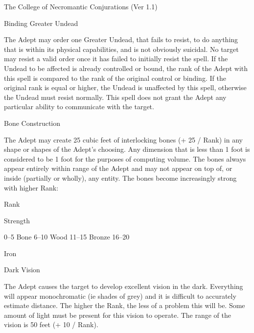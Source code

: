 \begin{Chapter}{The College of Necromantic Conjurations (Ver 1.1)}
\begin{spell}[S-3]{Binding Greater Undead}
\begin{effects}
The Adept may order one Greater Undead, that fails to resist, to do
anything that is within its physical capabilities, and is not
obviously suicidal.  No target may resist a valid order once it has
failed to initially resist the spell.  If the Undead to be affected is
already controlled or bound, the rank of the Adept with this spell is
compared to the rank of the original control or binding. If the
original rank is equal or higher, the Undead is unaffected by this
spell, otherwise the Undead must resist normally.  This spell does not
grant the Adept any particular ability to communicate with the target.
\end{effects}
\end{spell}

\begin{spell}[S-4]{Bone Construction}

\begin{effects}
The Adept may create 25 cubic feet of interlocking bones (+ 25 / Rank)
in any shape or shapes of the Adept’s choosing.  Any dimension that is
less than 1 foot is considered to be 1 foot for the purposes of
computing volume.  The bones always appear entirely within range of
the Adept and may not appear on top of, or inside (partially or
wholly), any entity. The bones become increasingly strong with higher
Rank:

Rank 

Strength 

0–5 
Bone 
6–10  Wood 
11–15  Bronze 
16–20 

Iron 

\end{effects}
\end{spell}

\begin{spell}[S-5]{Dark Vision}

\begin{effects}
The Adept causes the target to develop excellent vision in the dark.
Everything will appear monochromatic (ie shades of grey) and it is
difficult to accurately estimate distance. The higher the Rank, the
less of a problem this will be.  Some amount of light must be present
for this vision to operate.  The range of the vision is 50 feet (+ 10
/ Rank).
\end{effects}
\end{spell}


\end{Chapter}
